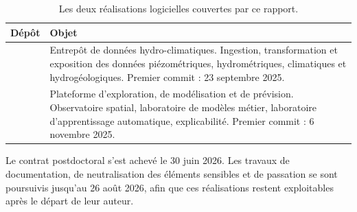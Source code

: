\begin{table}[H]
\centering
\caption{Les deux réalisations logicielles couvertes par ce rapport.}
\label{tab:perimetre}
\begin{tabularx}{\textwidth}{@{}lX@{}}
\toprule
\textbf{Dépôt} & \textbf{Objet} \\
\midrule
\hubeau{}~\cite{depot_entrepot} & Entrepôt de données hydro-climatiques. Ingestion, transformation et exposition
des données piézométriques, hydrométriques, climatiques et hydrogéologiques. Premier commit :
23 septembre 2025. \\
\junon{}~\cite{depot_plateforme} & Plateforme d'exploration, de modélisation et de prévision. Observatoire spatial,
laboratoire de modèles métier, laboratoire d'apprentissage automatique, explicabilité. Premier
commit : 6 novembre 2025. \\
\bottomrule
\end{tabularx}
\end{table}

Le contrat postdoctoral s'est achevé le 30 juin 2026. Les travaux de documentation, de
neutralisation des éléments sensibles et de passation se sont poursuivis jusqu'au 26 août 2026,
afin que ces réalisations restent exploitables après le départ de leur auteur.

